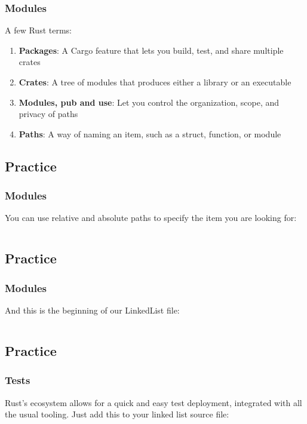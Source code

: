 \documentclass[usenames,twocolumn,dvipsnames,10pt,a4wide]{article}
\begin{document}
	\subsubsection{Modules}	
	A few Rust terms:
	\begin{enumerate}
		\item \textbf{Packages}: A Cargo feature that lets
			you build, test, and share multiple crates
		\item \textbf{Crates}: A tree of modules that 
			produces either a library or an executable
		\item \textbf{Modules, pub and use}: Let you control the organization, scope, and privacy of paths
		\item \textbf{Paths}: A way of naming an item, such as a struct, function, or module
	\end{enumerate}


\subsection{Practice}
	\subsubsection{Modules}
	You can use relative and absolute paths to
	specify the item you are looking for:
	
	\inputminted[fontsize=\normalsize]{rust}{code/modules.rs}


\subsection{Practice}
	\subsubsection{Modules}
	And this is the beginning of our LinkedList file:
	
	\inputminted[fontsize=\normalsize]{rust}{code/list11.rs}


\subsection{Practice}
	\subsubsection{Tests}
	Rust's ecosystem allows for a quick and easy test
	deployment, integrated with all the usual tooling.
	Just add this to your linked list source file:
	
\end{document}
